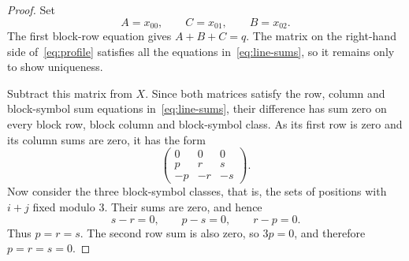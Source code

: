 \documentclass[10pt,a4paper]{amsart}
\begin{document}
\begin{proof}
Set
\[
A=x_{00},\qquad C=x_{01},\qquad B=x_{02}.
\]
The first block-row equation gives $A+B+C=q$. The matrix on the right-hand side of~\eqref{eq:profile} satisfies all the equations in~\eqref{eq:line-sums}, so it remains only to show uniqueness.

Subtract this matrix from $X$. Since both matrices satisfy the row, column and block-symbol sum equations in~\eqref{eq:line-sums}, their difference has sum zero on every block row, block column and block-symbol class. As its first row is zero and its column sums are zero, it has the form
\[
\begin{pmatrix}
0&0&0\\
p&r&s\\
-p&-r&-s
\end{pmatrix}.
\]
Now consider the three block-symbol classes, that is, the sets of positions with $i+j$ fixed modulo $3$. Their sums are zero, and hence
\[
s-r=0,\qquad p-s=0,\qquad r-p=0.
\]
Thus $p=r=s$. The second row sum is also zero, so $3p=0$, and therefore $p=r=s=0$.
\end{proof}
\end{document}
